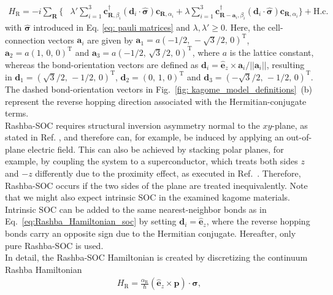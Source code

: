 \begin{align}
H_{\mathrm R}
=-
i\sum_{\mathbf R}
\Bigg\{
&
\lambda'
\sum_{i=1}^{3}
\mathbf{c}_{\mathbf R,\beta_i}^{\dagger}
(\mathbf d_i\!\cdot\!\hat{\bm{\sigma}})
\mathbf{c}_{\mathbf R,\alpha_i}
+
\lambda
\sum_{i=1}^{3}
\mathbf{c}_{\mathbf R-\mathbf a_i,\beta_i}^{\dagger}
(\mathbf d_i\!\cdot\!\hat{\bm{\sigma}})
\mathbf{c}_{\mathbf R,\alpha_i}
\Bigg\}
+\mathrm{H.c.}
\label{eq:Rashba_Hamiltonian_soc}
\end{align}
with $\bm{\hat{\sigma}}$ introduced in Eq. \eqref{eq: pauli matrices} and $\lambda,\lambda'\geq0$. 
Here, the cell-connection vectors $\mathbf{a}_i$ are given by $\mathbf{a}_1  = a(-1/2,\,-\sqrt{3}/2,\, 0)^{\mathrm T}$, $\mathbf{a}_2 = a(1,\,0,\,0)^{\mathrm T}$ and $\mathbf{a}_3 = a(-1/2,\,\sqrt{3}/2,\, 0)^{\mathrm T}$, where $a$ is the lattice constant, whereas the bond-orientation vectors are defined as $\mathbf{d}_i = \mathbf{\hat{e}}_z\times\mathbf{a}_i/||\mathbf{a}_i||$, resulting in $\mathbf{d}_1=(\sqrt{3}/2,\,-1/2,\, 0)^{\mathrm T}$, $\mathbf{d}_2=(0,\,1,\, 0)^{\mathrm T}$ and $\mathbf{d}_3=(-\sqrt{3}/2,\,-1/2,\, 0)^{\mathrm T}$. The dashed bond-orientation vectors in Fig.~\ref{fig: kagome_model_definitions}~(b) represent the reverse hopping direction associated with the Hermitian-conjugate terms. \\
Rashba-SOC requires structural inversion asymmetry normal to the $xy$-plane, as stated in Ref. \cite{Manchon2015}, and therefore can, for example, be induced by applying an out-of-plane electric field. This can also be achieved by stacking polar planes, for example, by coupling the system to a superconductor, which treats both sides $z$ and $-z$ differently due to the proximity effect, as executed in Ref.~\cite{Quelle3}. Therefore, Rashba-SOC occurs if the two sides of the plane are treated inequivalently.
Note that we might also expect intrinsic SOC in the examined kagome materials. Intrinsic SOC can be added to the same nearest-neighbor bonds as in Eq.~\eqref{eq:Rashba_Hamiltonian_soc} by setting $\mathbf{d}_i = \bm{\hat{e}}_z$, where the reverse hopping bonds carry an opposite sign due to the Hermitian conjugate. Hereafter, only pure Rashba-SOC is used. 
\\
In detail, the Rashba-SOC Hamiltonian is created by discretizing the continuum Rashba Hamiltonian
\begin{align}
    H_\text{R} = \frac{\alpha_\text{R}}{\hbar} \left(\mathbf{\hat{e}}_z\times \mathbf{p}\right) \cdot \bm{\sigma},
    \label{eq: Rashba_Hamiltonian_standard}
\end{align}
